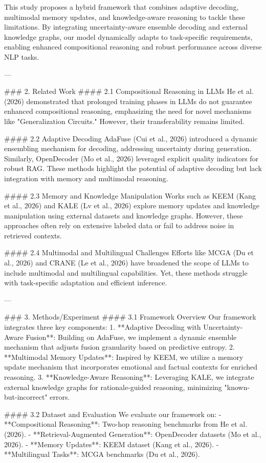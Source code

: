 This study proposes a hybrid framework that combines adaptive decoding, multimodal memory updates, and knowledge-aware reasoning to tackle these limitations. By integrating uncertainty-aware ensemble decoding and external knowledge graphs, our model dynamically adapts to task-specific requirements, enabling enhanced compositional reasoning and robust performance across diverse NLP tasks.

---

### 2. Related Work
#### 2.1 Compositional Reasoning in LLMs
He et al. (2026) demonstrated that prolonged training phases in LLMs do not guarantee enhanced compositional reasoning, emphasizing the need for novel mechanisms like "Generalization Circuits." However, their transferability remains limited.

#### 2.2 Adaptive Decoding
AdaFuse (Cui et al., 2026) introduced a dynamic ensembling mechanism for decoding, addressing uncertainty during generation. Similarly, OpenDecoder (Mo et al., 2026) leveraged explicit quality indicators for robust RAG. These methods highlight the potential of adaptive decoding but lack integration with memory and multimodal reasoning.

#### 2.3 Memory and Knowledge Manipulation
Works such as KEEM (Kang et al., 2026) and KALE (Lv et al., 2026) explore memory updates and knowledge manipulation using external datasets and knowledge graphs. However, these approaches often rely on extensive labeled data or fail to address noise in retrieved contexts.

#### 2.4 Multimodal and Multilingual Challenges
Efforts like MCGA (Du et al., 2026) and CRANE (Le et al., 2026) have broadened the scope of LLMs to include multimodal and multilingual capabilities. Yet, these methods struggle with task-specific adaptation and efficient inference.

---

### 3. Methods/Experiment
#### 3.1 Framework Overview
Our framework integrates three key components:
1. **Adaptive Decoding with Uncertainty-Aware Fusion**: Building on AdaFuse, we implement a dynamic ensemble mechanism that adjusts fusion granularity based on predictive entropy.
2. **Multimodal Memory Updates**: Inspired by KEEM, we utilize a memory update mechanism that incorporates emotional and factual contexts for enriched reasoning.
3. **Knowledge-Aware Reasoning**: Leveraging KALE, we integrate external knowledge graphs for rationale-guided reasoning, minimizing "known-but-incorrect" errors.

#### 3.2 Dataset and Evaluation
We evaluate our framework on:
- **Compositional Reasoning**: Two-hop reasoning benchmarks from He et al. (2026).
- **Retrieval-Augmented Generation**: OpenDecoder datasets (Mo et al., 2026).
- **Memory Updates**: KEEM dataset (Kang et al., 2026).
- **Multilingual Tasks**: MCGA benchmarks (Du et al., 2026).

